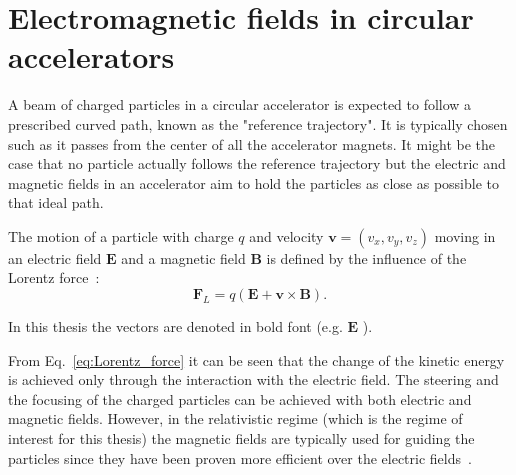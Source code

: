\section{Electromagnetic fields in circular accelerators}\label{sec:EM_fields_intro}

A beam of charged particles in a circular accelerator is expected to follow a prescribed curved path, known as the "reference trajectory". It is typically chosen such as it passes from the center of all the accelerator magnets. It might be the case that no particle actually follows the reference trajectory but the electric and magnetic fields in an accelerator aim to hold the particles as close as possible to that ideal path. 



The motion of a particle with charge $q$ and velocity $\mathbf{v}=(v_x, v_y, v_z)$ moving in an electric field $\mathbf{E}$ and a magnetic field $\mathbf{B}$ is defined by the influence of the Lorentz force~\cite{Wiedemann:1083415}: 
\begin{equation}\label{eq:Lorentz_force}
 \mathbf{F}_L = q(\mathbf{E} + \mathbf{v} \times \mathbf{B}).
\end{equation}

In this thesis the vectors are denoted in bold font (e.g. $\mathbf{E}$ ). %

From Eq.~\eqref{eq:Lorentz_force} it can be seen that the change of the kinetic energy is achieved only through the interaction with the electric field. The steering and the focusing of the charged particles can be achieved with both electric and magnetic fields. However, in the relativistic regime (which is the regime of interest for this thesis) the magnetic fields are typically used for guiding the particles since they have been proven more efficient over the electric fields~\cite{Wiedemann:1083415}.

